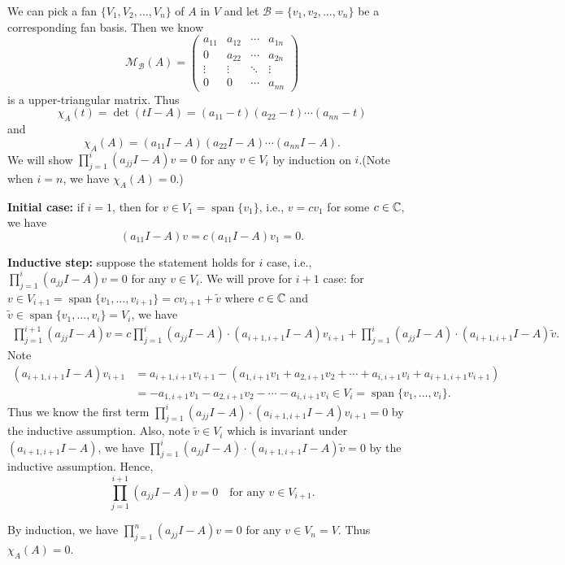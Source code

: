 \begin{proofenv}
    We can pick a fan $\{ V_1, V_2, \ldots, V_n \}$ of $A$ in $V$ and let $\mathcal B = \{ v_1, v_2, \ldots, v_n \}$ be a corresponding fan basis. Then we know
    $$ \mathcal M_\mathcal{B}(A) = \begin{pmatrix}
        a_{11} & a_{12} & \cdots & a_{1n} \\
        0 & a_{22} & \cdots & a_{2n} \\
        \vdots & \vdots & \ddots & \vdots \\
        0 & 0 & \cdots & a_{nn}
    \end{pmatrix}$$
    is a upper-triangular matrix. Thus
    $$ \chi_A(t) = \det (tI - A) = (a_{11} - t)(a_{22} - t) \cdots (a_{nn} - t) $$
    and
    $$ \chi_A(A) = (a_{11} I - A)(a_{22} I - A) \cdots (a_{nn} I - A). $$
    We will show $\displaystyle \prod_{j=1}^{i}(a_{jj} I - A) v = 0$ for any $v \in V_i$ by induction on $i$.(Note when $i=n$, we have $\chi_A(A) =0$.)

    \textbf{Initial case:} if $i=1$, then for $v \in V_1 = \operatorname{span} \{ v_1 \}$, i.e., $v = c v_1$ for some $c\in \mathbb{C}$, we have
    $$ (a_{11} I - A) v = c(a_{11} I - A) v_1 = 0. $$


    \textbf{Inductive step:} suppose the statement holds for $i$ case, i.e.,
    $\displaystyle \prod_{j=1}^i (a_{jj} I - A) v = 0$ for any $v \in V_i$. We will prove for $i+1$ case: for $v \in V_{i+1} = \operatorname{span} \{ v_1, \ldots, v_{i+1} \} = cv_{i+1} + \widetilde{v}$ where $c\in \mathbb{C}$ and $\widetilde{v} \in \operatorname{span} \{ v_1, \ldots, v_i \} = V_i$, we have
    \begin{align*}
        \prod_{j=1}^{i+1} (a_{jj} I - A) v = c\prod_{j=1}^{i} (a_{jj} I - A) \cdot (a_{i+1,i+1} I - A) v_{i+1} + \prod_{j=1}^i (a_{jj} I - A) \cdot (a_{i+1,i+1} I - A) \widetilde{v}.
    \end{align*}
    Note
    $$\begin{aligned}
        (a_{i+1,i+1} I - A) v_{i+1} &= a_{i+1,i+1} v_{i+1} - (a_{1,i+1} v_1 + a_{2,i+1} v_2 + \cdots + a_{i,i+1} v_i + a_{i+1,i+1} v_{i+1})\\ &= -a_{1,i+1} v_1 - a_{2,i+1} v_2 - \cdots - a_{i,i+1} v_i \in V_i = \operatorname{span}\{ v_1, \ldots, v_i \}.
    \end{aligned}$$
    Thus we know the first term $\displaystyle \prod_{j=1}^i (a_{jj} I - A) \cdot (a_{i+1,i+1} I - A) v_{i+1} = 0$ by the inductive assumption. Also, note $\displaystyle \widetilde{v} \in V_i$ which is invariant under $(a_{i+1,i+1} I - A)$, we have $\displaystyle \prod_{j=1}^i (a_{jj} I - A) \cdot (a_{i+1,i+1} I - A) \widetilde{v} = 0$ by the inductive assumption. Hence,
    $$\prod_{j=1}^{i+1} (a_{jj} I - A) v = 0 \quad \text{for any } v \in V_{i+1}. $$

    By induction, we have $\displaystyle \prod_{j=1}^n (a_{jj} I - A) v = 0$ for any $v \in V_n = V$. Thus $\chi_A(A) = 0$.
\end{proofenv}
